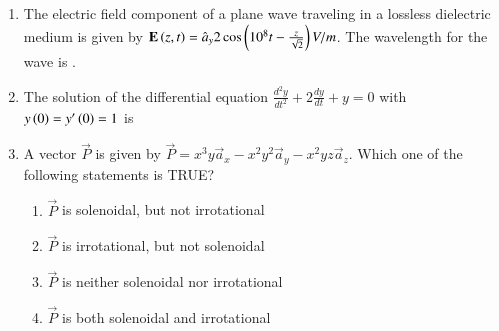 \documentclass[a4paper, 11pt]{article}
\begin{document}
\begin{enumerate}
    \hfill{}

    \item The electric field component of a plane wave traveling in a lossless dielectric medium is given by $\mathbf{E}\left(z,t\right)=\hat{a}_{y}2 \cos\left(10^{8}t-\frac{z}{\sqrt{2}}\right)V/m$. The wavelength  for the wave is \underline{\hspace{2cm}}.
    
    \hfill{}

    \item The solution of the differential equation $\frac{d^{2}y}{dt^{2}}+2\frac{dy}{dt}+y=0$ with $y\left(0\right)=y'\left(0\right)=1$ is
    \begin{enumerate}
    \end{enumerate}
    
    \hfill{}

    \item A vector $\vec{P}$ is given by $\vec{P}=x^{3}y\vec{a}_{x}-x^{2}y^{2}\vec{a}_{y}-x^{2}yz\vec{a}_{z}$. Which one of the following statements is TRUE?
    \begin{enumerate}
        \item $\vec{P}$ is solenoidal, but not irrotational
        \item $\vec{P}$ is irrotational, but not solenoidal
        \item $\vec{P}$ is neither solenoidal nor irrotational
        \item $\vec{P}$ is both solenoidal and irrotational
    \end{enumerate}
    
    \hfill{}


\end{enumerate}
\end{document}
